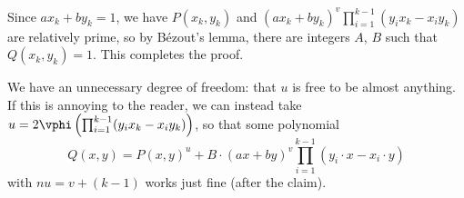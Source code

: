 Since $ax_k+by_k=1$, we have $P(x_k,y_k)$ and $(ax_k+by_k)^v\prod_{i=1}^{k-1}(y_ix_k-x_iy_k)$ are relatively prime, so by B\'ezout's lemma, there are integers $A$, $B$ such that $Q(x_k,y_k)=1$. This completes the proof.
\begin{boxremark}
    We have an unnecessary degree of freedom: that $u$ is free to be almost anything. If this is annoying to the reader, we can instead take $u=2\vphi\left(\prod_{i=1}^{k-1}(y_ix_k-x_iy_k)\right)$, so that some polynomial \[Q(x,y)=P(x,y)^u+B\cdot(ax+by)^v\prod_{i=1}^{k-1}(y_i\cdot x-x_i\cdot y)\]
    with $nu=v+(k-1)$ works just fine (after the claim).
\end{boxremark}

